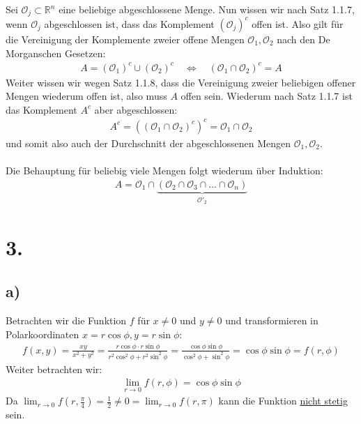 \documentclass[11pt,a4paper]{article}
\newcommand {\Rn}	{\mathbb{R}^n}
\newcommand{\1}    	{\mathbbm{1}}
\begin{document}
	Sei \(\mathcal{O}_j \subset \Rn\) eine beliebige abgeschlossene Menge. Nun wissen wir nach Satz 1.1.7, wenn \(\mathcal{O}_j\) abgeschlossen ist, dass das Komplement \((\mathcal{O}_j)^c\) offen ist. Also gilt für die Vereinigung der Komplemente zweier offene Mengen \(\mathcal{O}_1, \mathcal{O}_2 \) nach den De Morganschen Gesetzen:
	\begin{align*}
		A = (\mathcal{O}_1)^c \cup (\mathcal{O}_2)^c \quad\Leftrightarrow\quad \left( \mathcal{O}_1 \cap \mathcal{O}_2 \right)^c = A
	\end{align*}
	Weiter wissen wir wegen Satz 1.1.8, dass die Vereinigung zweier beliebigen offener Mengen wiederum offen ist, also muss \(A\) offen sein.
	Wiederum nach Satz 1.1.7 ist das Komplement \(A^c\) aber abgeschlossen:
	\begin{align*}
		A^c = \left( \left( \mathcal{O}_1 \cap \mathcal{O}_2 \right)^c \right)^c = \mathcal{O}_1 \cap \mathcal{O}_2
	\end{align*}
	und somit also auch der Durchschnitt der abgeschlossenen Mengen \(\mathcal{O}_1, \mathcal{O}_2 \). \\
	\\
	\noindent
	Die Behauptung für beliebig viele Mengen folgt wiederum über Induktion:
	\begin{align*}
		A = \mathcal{O}_1 \cap \underbrace{\left( \mathcal{O}_2 \cap \mathcal{O}_3 \cap ... \cap \mathcal{O}_n \right)}_{\mathcal{O}'_2} 
	\end{align*}
	
	\section*{3.}
	\subsection*{a)}
	Betrachten wir die Funktion \(f\) für \(x \neq 0\) und \(y \neq 0\) und transformieren in Polarkoordinaten \(x = r \cos \phi, y = r \sin \phi \):
	\begin{align*}
		f(x,y) = \frac{xy}{x^2 + y^2} = \frac{r \cos \phi \cdot r \sin \phi}{r^2 \cos^2 \phi + r^2 \sin^2 \phi} = \frac{\cos \phi \sin \phi}{ \cos^2 \phi + \sin^2 \phi} = \cos \phi \sin \phi = f(r,\phi)
	\end{align*}
	Weiter betrachten wir:
	\begin{align*}
		\lim_{r \rightarrow 0} f(r,\phi) =\cos \phi \sin \phi 
	\end{align*}
	Da \(\lim_{r \rightarrow 0} f \left( r,\frac{\pi}{4} \right) = \frac{1}{2} \neq 0 = \lim_{r \rightarrow 0} f( r, \pi ) \) kann die Funktion \underline{nicht stetig} sein.
	
\end{document}
